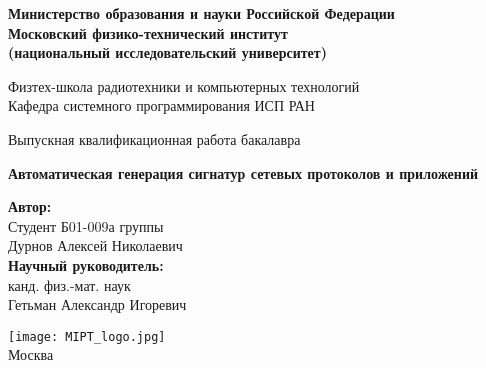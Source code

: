 \begin{center}

    \large\textbf{Министерство образования и науки Российской Федерации \\
    Московский физико-технический институт \\
    (национальный исследовательский университет)} \\
    \vspace{1cm}


    Физтех-школа радиотехники и компьютерных технологий \\

    Кафедра системного программирования ИСП РАН \\

    \vspace{3em}

    Выпускная квалификационная работа бакалавра
\end{center}

\begin{center}
    \vspace{\fill}
    \textbf{\LARGE{Автоматическая генерация сигнатур сетевых протоколов и приложений}}
    \vspace{\fill}
\end{center}


\begin{flushright}
    \textbf{Автор:} \\
    Студент Б01-009а группы \\
    Дурнов Алексей Николаевич \\
    \vspace{2em}
    \textbf{Научный руководитель:} \\
    канд. физ.-мат. наук \\
    Гетьман Александр Игоревич \\
\end{flushright}

\vspace{7em}

\begin{center}
    \texttt{[image: MIPT\_logo.jpg]}\\
    Москва \the\year{}
\end{center}

\thispagestyle{empty}
\newpage
\setcounter{page}{2}
\fancyfoot[c]{\thepage}
\fancyhead[L]{}
\fancyhead[R]{}
\fancyhead[C]{}
\renewcommand{\headrulewidth}{0pt}